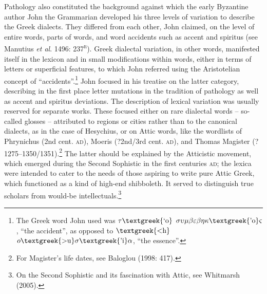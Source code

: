 \begin{styleCatalogusnotities}
Pathology also constituted the background against which the early Byzantine author John the Grammarian developed his three levels of variation to describe the Greek dialects. They differed from each other, John claimed, on the level of entire words, parts of words, and word accidents such as accent and spiritus (see Manutius \textit{et al}. 1496: 237\textsc{\textsuperscript{r}}). Greek dialectal variation, in other words, manifested itself in the lexicon and in small modifications within words, either in terms of letters or superficial features, to which John referred using the Aristotelian concept of “accidents”.\footnote{ The Greek word John used was $\tau \text{\textgreek{`o}}$ $\sigma \upsilon \mu \beta \varepsilon \beta \eta \kappa \text{\textgreek{'o}}\varsigma $, “the accident”, as opposed to $\text{\textgreek{<h}}$ $o\text{\textgreek{>u}}\sigma \text{\textgreek{'i}}\alpha $, “the essence”.} John focused in his treatise on the latter category, describing in the first place letter mutations in the tradition of pathology as well as accent and spiritus deviations. The description of lexical variation was usually reserved for separate works. These focused either on rare dialectal words – so-called glosses – attributed to regions or cities rather than to the canonical dialects, as in the case of Hesychius, or on Attic words, like the wordlists of Phrynichus (2nd cent. \textsc{ad}), Moeris (?2nd/3rd cent. \textsc{ad}), and Thomas Magister (?1275–1350/1351).\footnote{\textrm{ For Magister’s life dates, see Baloglou (1998: 417).}} The latter should be explained by the Atticistic movement, which emerged during the Second Sophistic in the first centuries \textsc{ad}; the lexica were intended to cater to the needs of those aspiring to write pure Attic Greek, which functioned as a kind of high-end shibboleth. It served to distinguish true scholars from would-be intellectuals.\footnote{ On the Second Sophistic and its fascination with Attic, see Whitmarsh (2005).}
\end{styleCatalogusnotities}

